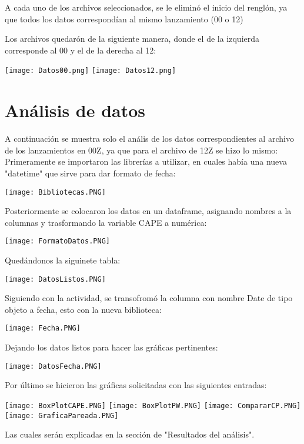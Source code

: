 \documentclass{article}
\begin{document}
A cada uno de los archivos seleccionados, se le eliminó el inicio del renglón, ya que todos los datos correspondían al mismo lanzamiento (00 o 12)

Los archivos quedarón de la siguiente manera, donde el de la izquierda corresponde al 00 y el de la derecha al 12:
\begin{center}
    \texttt{[image: Datos00.png]}
    \texttt{[image: Datos12.png]}
\end{center}
\section{Análisis de datos}
A continuación se muestra solo el anális de los datos correspondientes al archivo de los lanzamientos en 00Z, ya que para el archivo de 12Z se hizo lo mismo:
Primeramente se importaron las librerías a utilizar, en cuales había una nueva "datetime" que sirve para dar formato de fecha:
\begin{center}
    \texttt{[image: Bibliotecas.PNG]}
\end{center}
Posteriormente se colocaron los datos en un dataframe, asignando nombres a la columnas y trasformando la variable CAPE a numérica:
\begin{center}
    \texttt{[image: FormatoDatos.PNG]}
\end{center}
Quedándonos la siguinete tabla:
\begin{center}
    \texttt{[image: DatosListos.PNG]}
\end{center}
Siguiendo con la actividad, se transofromó la columna con nombre Date de tipo objeto a fecha, esto con la nueva biblioteca:
\begin{center}
    \texttt{[image: Fecha.PNG]}
\end{center}
Dejando los datos listos para hacer las gráficas pertinentes:
\begin{center}
    \texttt{[image: DatosFecha.PNG]}
\end{center}
Por último se hicieron las gráficas solicitadas con las siguientes entradas:
\begin{center}
    \texttt{[image: BoxPlotCAPE.PNG]}
    \texttt{[image: BoxPlotPW.PNG]}
    \texttt{[image: CompararCP.PNG]}
    \texttt{[image: GraficaPareada.PNG]}
\end{center}
Las cuales serán explicadas en la sección de "Resultados del análisis".
\end{document}
